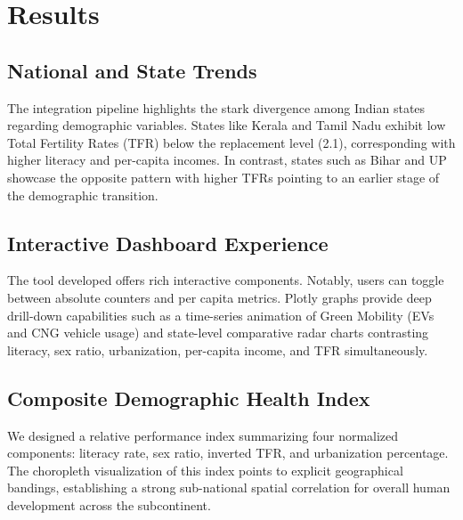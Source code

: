 \documentclass[abstract=true]{scrartcl}
\begin{document}
\section{Results}
\subsection{National and State Trends}
The integration pipeline highlights the stark divergence among Indian states regarding demographic variables. States like Kerala and Tamil Nadu exhibit low Total Fertility Rates (TFR) below the replacement level (2.1), corresponding with higher literacy and per-capita incomes. In contrast, states such as Bihar and UP showcase the opposite pattern with higher TFRs pointing to an earlier stage of the demographic transition.

\subsection{Interactive Dashboard Experience}
The tool developed offers rich interactive components. Notably, users can toggle between absolute counters and per capita metrics. Plotly graphs provide deep drill-down capabilities such as a time-series animation of Green Mobility (EVs and CNG vehicle usage) and state-level comparative radar charts contrasting literacy, sex ratio, urbanization, per-capita income, and TFR simultaneously.

\subsection{Composite Demographic Health Index}
We designed a relative performance index summarizing four normalized components: literacy rate, sex ratio, inverted TFR, and urbanization percentage. The choropleth visualization of this index points to explicit geographical bandings, establishing a strong sub-national spatial correlation for overall human development across the subcontinent.
\end{document}
